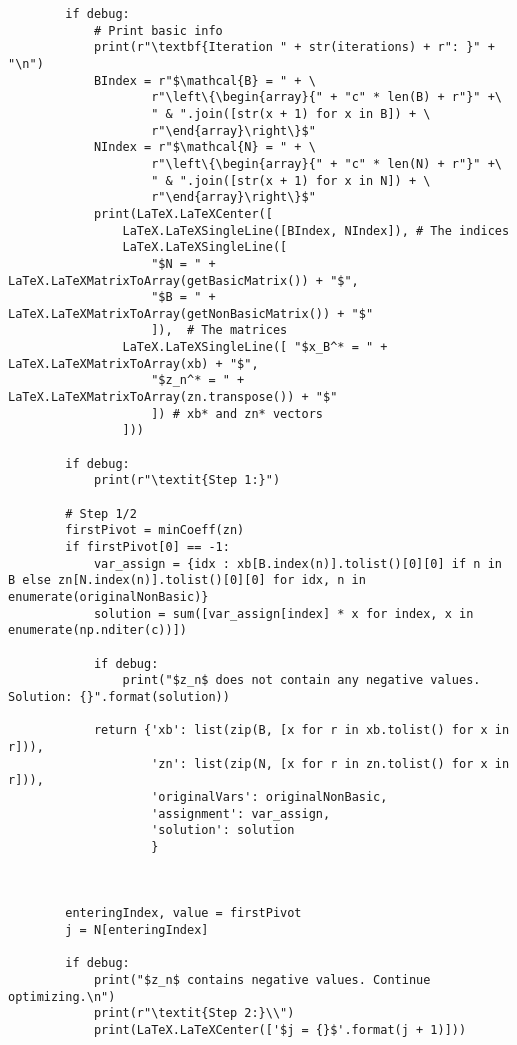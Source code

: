 \documentclass{article}
\begin{document}
\begin{lstlisting}
        if debug:
            # Print basic info
            print(r"\textbf{Iteration " + str(iterations) + r": }" + "\n")
            BIndex = r"$\mathcal{B} = " + \
                    r"\left\{\begin{array}{" + "c" * len(B) + r"}" +\
                    " & ".join([str(x + 1) for x in B]) + \
                    r"\end{array}\right\}$"
            NIndex = r"$\mathcal{N} = " + \
                    r"\left\{\begin{array}{" + "c" * len(N) + r"}" +\
                    " & ".join([str(x + 1) for x in N]) + \
                    r"\end{array}\right\}$"
            print(LaTeX.LaTeXCenter([
                LaTeX.LaTeXSingleLine([BIndex, NIndex]), # The indices
                LaTeX.LaTeXSingleLine([
                    "$N = " + LaTeX.LaTeXMatrixToArray(getBasicMatrix()) + "$",
                    "$B = " + LaTeX.LaTeXMatrixToArray(getNonBasicMatrix()) + "$"
                    ]),  # The matrices
                LaTeX.LaTeXSingleLine([ "$x_B^* = " + LaTeX.LaTeXMatrixToArray(xb) + "$",
                    "$z_n^* = " + LaTeX.LaTeXMatrixToArray(zn.transpose()) + "$"
                    ]) # xb* and zn* vectors
                ]))

        if debug:
            print(r"\textit{Step 1:}")

        # Step 1/2
        firstPivot = minCoeff(zn)
        if firstPivot[0] == -1:
            var_assign = {idx : xb[B.index(n)].tolist()[0][0] if n in B else zn[N.index(n)].tolist()[0][0] for idx, n in enumerate(originalNonBasic)}
            solution = sum([var_assign[index] * x for index, x in enumerate(np.nditer(c))])

            if debug:
                print("$z_n$ does not contain any negative values. Solution: {}".format(solution))

            return {'xb': list(zip(B, [x for r in xb.tolist() for x in r])),
                    'zn': list(zip(N, [x for r in zn.tolist() for x in r])),
                    'originalVars': originalNonBasic,
                    'assignment': var_assign,
                    'solution': solution
                    }

        

        enteringIndex, value = firstPivot
        j = N[enteringIndex]

        if debug:
            print("$z_n$ contains negative values. Continue optimizing.\n")
            print(r"\textit{Step 2:}\\")
            print(LaTeX.LaTeXCenter(['$j = {}$'.format(j + 1)]))


\end{lstlisting}
\end{document}
